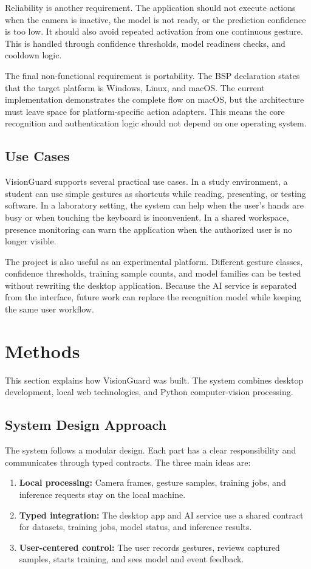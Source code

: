 \documentclass[10pt,twocolumn]{article}
\begin{document}
Reliability is another requirement.
The application should not execute actions when the camera is inactive, the model is not ready, or the prediction confidence is too low.
It should also avoid repeated activation from one continuous gesture.
This is handled through confidence thresholds, model readiness checks, and cooldown logic.

The final non-functional requirement is portability.
The BSP declaration states that the target platform is Windows, Linux, and macOS.
The current implementation demonstrates the complete flow on macOS, but the architecture must leave space for platform-specific action adapters.
This means the core recognition and authentication logic should not depend on one operating system.

\subsection{Use Cases}
VisionGuard supports several practical use cases.
In a study environment, a student can use simple gestures as shortcuts while reading, presenting, or testing software.
In a laboratory setting, the system can help when the user's hands are busy or when touching the keyboard is inconvenient.
In a shared workspace, presence monitoring can warn the application when the authorized user is no longer visible.

The project is also useful as an experimental platform.
Different gesture classes, confidence thresholds, training sample counts, and model families can be tested without rewriting the desktop application.
Because the AI service is separated from the interface, future work can replace the recognition model while keeping the same user workflow.

\section{Methods}
This section explains how VisionGuard was built.
The system combines desktop development, local web technologies, and Python computer-vision processing.

\subsection{System Design Approach}
The system follows a modular design.
Each part has a clear responsibility and communicates through typed contracts.
The three main ideas are:

\begin{enumerate}[leftmargin=*]
  \item \textbf{Local processing:} Camera frames, gesture samples, training jobs, and inference requests stay on the local machine.
  \item \textbf{Typed integration:} The desktop app and AI service use a shared contract for datasets, training jobs, model status, and inference results.
  \item \textbf{User-centered control:} The user records gestures, reviews captured samples, starts training, and sees model and event feedback.
\end{enumerate}
\end{document}
